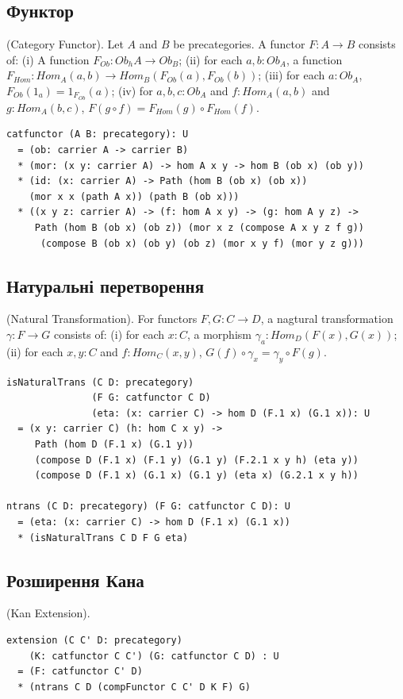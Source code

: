 \subsection{Функтор}
\begin{definition} (Category Functor). Let $A$ and $B$ be precategories.
A functor $F : A \rightarrow B$ consists of: (i) A function $F_{Ob}: Ob_hA \rightarrow Ob_B$;
(ii) for each $a,b:Ob_A$, a function $F_{Hom}:Hom_A(a,b)\rightarrow Hom_B(F_{Ob}(a),F_{Ob}(b))$;
(iii) for each $a:Ob_A$, $F_{Ob}(1_a) = 1_{F_{Ob}}(a)$;
(iv) for $a,b,c:Ob_A$ and $f: Hom_A(a,b)$ and $g: Hom_A(b,c)$, $F(g\circ f) = F_{Hom}(g)\circ F_{Hom}(f)$.
\begin{lstlisting}
catfunctor (A B: precategory): U
  = (ob: carrier A -> carrier B)
  * (mor: (x y: carrier A) -> hom A x y -> hom B (ob x) (ob y))
  * (id: (x: carrier A) -> Path (hom B (ob x) (ob x))
    (mor x x (path A x)) (path B (ob x)))
  * ((x y z: carrier A) -> (f: hom A x y) -> (g: hom A y z) ->
     Path (hom B (ob x) (ob z)) (mor x z (compose A x y z f g))
      (compose B (ob x) (ob y) (ob z) (mor x y f) (mor y z g)))
\end{lstlisting}
\end{definition}

\subsection{Натуральні перетворення}
\begin{definition} (Natural Transformation).
For functors $F,G: C \rightarrow D$,
a nagtural transformation $\gamma: F \rightarrow G$ consists of:
(i) for each $x:C$, a morphism $\gamma_a : Hom_D(F(x),G(x))$;
(ii) for each $x,y:C$ and $f: Hom_C(x,y)$, $G(f)\circ \gamma_x = \gamma_y \circ F(g)$.
\begin{lstlisting}
isNaturalTrans (C D: precategory)
               (F G: catfunctor C D)
               (eta: (x: carrier C) -> hom D (F.1 x) (G.1 x)): U
  = (x y: carrier C) (h: hom C x y) ->
     Path (hom D (F.1 x) (G.1 y))
     (compose D (F.1 x) (F.1 y) (G.1 y) (F.2.1 x y h) (eta y))
     (compose D (F.1 x) (G.1 x) (G.1 y) (eta x) (G.2.1 x y h))

ntrans (C D: precategory) (F G: catfunctor C D): U
  = (eta: (x: carrier C) -> hom D (F.1 x) (G.1 x))
  * (isNaturalTrans C D F G eta)
\end{lstlisting}
\end{definition}

\subsection{Розширення Кана}
\begin{definition} (Kan Extension).
\begin{lstlisting}
extension (C C' D: precategory)
    (K: catfunctor C C') (G: catfunctor C D) : U
  = (F: catfunctor C' D)
  * (ntrans C D (compFunctor C C' D K F) G)
\end{lstlisting}
\end{definition}

